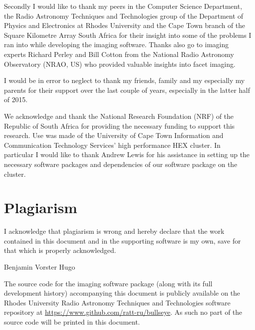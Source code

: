  Secondly I would like to thank my peers in the Computer Science Department, the Radio Astronomy Techniques and Technologies group of the Department 
 of Physics and Electronics at Rhodes University and the Cape Town branch of the Square Kilometre Array South Africa for their insight into some of 
 the problems I ran into while developing the imaging software. Thanks also go to imaging experts Richard Perley and Bill Cotton from the 
 National Radio Astronomy Observatory (NRAO, US) who provided valuable insights into facet imaging.
 
 I would be in error to neglect to thank my friends, family and my especially my parents for their support over the last couple of years, 
 especially in the latter half of 2015.
 
 We acknowledge and thank the National Research Foundation (NRF) of the Republic of South Africa for providing the necessary funding to support 
 this research. Use was made of the University of Cape Town
 Information and Communication Technology Services' high performance HEX cluster. 
 In particular I would like to thank Andrew Lewis for his assistance in setting up the necessary software packages and 
 dependencies of our software package on the cluster.
\chapter*{Plagiarism}
 I acknowledge that plagiarism is wrong and hereby declare that the work contained in this document and in the supporting software is my own, save for that which is properly acknowledged.
 \vspace{55pt}
 
 Benjamin Vorster Hugo
 \clearpage
  \vspace*{\fill}
    \begin{center}
     \huge
     The source code for the imaging software package (along with its full development history) accompanying this document is publicly available on the Rhodes University Radio Astronomy 
     Techniques and Technologies software repository at \url{https://www.github.com/ratt-ru/bullseye}. As such no part of the source code will be printed in this document.
    \end{center}
  \vspace*{\fill}
 \clearpage
{\let\clearpage\relax \tableofcontents \listoffigures \listoftables}